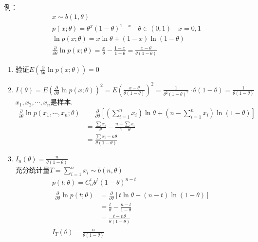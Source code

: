 例：$$\begin{array}{l}
x \sim b(1, \theta) \\
p(x ; \theta)=\theta^{x}(1-\theta)^{1-x} \quad \theta \in(0,1) \quad x=0,1 \\
\ln p(x ; \theta)=x \ln \theta+(1-x) \ln (1-\theta) \\
\frac{\partial}{\partial \theta} \ln p(x ; \theta)=\frac{x}{\theta}-\frac{1-x}{1-\theta}=\frac{x-\theta}{\theta(1-\theta)}
\end{array}$$
\begin{enumerate}
    \item 验证$E(\frac{\partial }{\partial \theta } \ln p(x;\theta ))=0$
    \item $I(\theta)=E(\frac{\partial }{\partial \theta } \ln p(x;\theta ))^{2}=E(\frac{x-\theta}{\theta(1-\theta)})^{2}=\frac{1}{\theta^{2}(1-\theta)^{2}}\cdot\theta(1-\theta)=\frac{1}{\theta(1-\theta)}$\\
    $x_{1},x_{2},\cdots,x_{n}$是样本.
    $$\begin{aligned}
    \frac{\partial}{\partial \theta} \ln p\left(x_{1}, \cdots, x_{n} ; \theta\right) &=\frac{\partial}{\partial \theta}\left[\left(\sum_{i=1}^{n} x_{i}\right) \ln \theta+\left(n-\sum_{i=1}^{n} x_{i}\right) \ln (1-\theta)\right] \\
    &=\frac{\sum x_{i}}{\theta}-\frac{n-\sum x_{i}}{1-\theta}\\
    &=\frac{\sum x_{i}-n \theta}{\theta(1-\theta)}
    \end{aligned}$$
    \item $I_{n}(\theta)=\frac{n}{\theta(1-\theta)}$\\
    充分统计量$T=\sum_{i=1}^{n} x_{i}\sim b(n,\theta)$
    $$\begin{array}{l}
    p(t ; \theta)=C_{n}^{t} \theta^{t}(1-\theta)^{n-t} \\
    \begin{aligned}
    \frac{\partial}{\partial \theta} \ln p(t ; \theta) &=\frac{\partial}{\partial \theta}[t \ln \theta+(n-t) \ln (1-\theta)] \\
    &=\frac{t}{\theta}-\frac{n-t}{1-\theta}\\
    &=\frac{t-n \theta}{\theta(1-\theta)}
    \end{aligned} \\
    I_{T}(\theta)=\frac{n}{\theta(1-\theta)}
    \end{array}$$
\end{enumerate}
